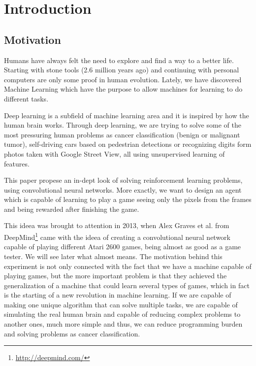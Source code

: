 \chapter{Introduction}
\label{chapter:intro}

\section{Motivation}
\label{sec:motivation}
Humans have always felt the need to explore and find a way to a better life. Starting with stone tools (2.6 million years ago) and continuing with personal computers are only some proof in human evolution. Lately, we have discovered Machine Learning which have the purpose to allow machines for learning to do different tasks.

Deep learning is a subfield of machine learning area and it is inspired by how the human brain works. Through deep learning, we are trying to solve some of the most pressuring human problems as cancer classification (benign or malignant tumor)\cite{mitosis}, self-driving cars based on pedestrian detections\cite{pedestrian} or recognizing digits form photos taken with Google Street View\cite{svhn}, all using unsupervised learning of features.

This paper propese an in-dept look of solving reinforcement learning problems, using convolutional neural networks. More exactly, we want to design an agent which is capable of learning to play a game\cite{atari} seeing only the pixels from the frames and being rewarded after finishing the game.

This ideea was brought to attention in 2013, when Alex Graves et al. from DeepMind\footnote{\url{http://deepmind.com/}} came with the ideea of creating a convolutional neural network capable of playing different Atari 2600 games, being almost as good as a game tester. We will see later what almost means. The motivation behind this experiment is not only connected with the fact that we have a machine capable of playing games, but the more important problem is that they achieved the generalization of a machine that could learn several types of games, which in fact is the starting of a new revolution in machine learning. If we are capable of making one unique algorithm that can solve multiple tasks, we are capable of simulating the real human brain and capable of reducing complex problems to another ones, much more simple and thus, we can reduce programming burden and solving problems as cancer classification.

